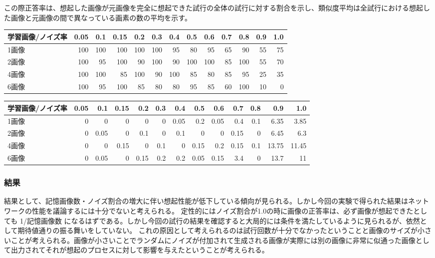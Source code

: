 \documentclass{ltjsarticle}
\begin{document}
この際正答率は、想起した画像が元画像を完全に想起できた試行の全体の試行に対する割合を示し、類似度平均は全試行における想起した画像と元画像の間で異なっている画素の数の平均を示す。
\begin{center}
  \begin{tabular}{|l|r|r|r|r|r|r|r|r|r|r|r|r|} \hline
    学習画像/ノイズ率 & 0.05 & 0.1 & 0.15 & 0.2 & 0.3 & 0.4 & 0.5 & 0.6 & 0.7 & 0.8 & 0.9 & 1.0 \\ \hline
    1画像 & 100 & 100 & 100 & 100 & 100 & 95 & 80 & 95 & 65 & 90 & 55 & 75 \\
    2画像 & 100 & 95 & 100 & 90 & 100 & 90 & 100 & 100 & 85 & 100 & 55 & 70 \\
    4画像 & 100  & 100 & 85 & 100 & 90 & 100 & 85 & 80 & 85 & 95 & 25 & 35 \\
    6画像 & 100 & 95 & 100 & 85 & 80 & 80 & 95 & 85 & 60 & 100 & 10 & 0 \\ \hline
  \end{tabular}
  \begin{tabular}{|l|r|r|r|r|r|r|r|r|r|r|r|r|} \hline
    学習画像/ノイズ率 & 0.05 & 0.1 & 0.15 & 0.2 & 0.3 & 0.4 & 0.5 & 0.6 & 0.7 & 0.8 & 0.9 & 1.0 \\ \hline
    1画像 & 0 & 0 & 0 & 0 & 0 & 0.05 & 0.2 & 0.05 & 0.4 & 0.1 & 6.35 & 3.85 \\
    2画像 & 0 & 0.05 & 0 & 0.1 & 0 & 0.1 & 0 & 0 & 0.15 & 0 & 6.45 & 6.3 \\
    4画像 & 0  & 0 & 0.15 & 0 & 0.1 & 0 & 0.15 & 0.2 & 0.15 & 0.1 & 13.75 & 11.45 \\
    6画像 & 0 & 0.05 & 0 & 0.15 & 0.2 & 0.2 & 0.05 & 0.15 & 3.4 & 0 & 13.7 & 11 \\ \hline
  \end{tabular}
\end{center}

\subsubsection{結果}
結果として、記憶画像数・ノイズ割合の増大に伴い想起性能が低下している傾向が見られる。しかし今回の実験で得られた結果はネットワークの性能を議論するには十分でないと考えられる。
定性的にはノイズ割合が1.0の時に画像の正答率は、必ず画像が想起できたとしても 1/記憶画像数 になるはずである。しかし今回の試行の結果を確認すると大局的には条件を満たしているように見られるが、依然として期待値通りの振る舞いをしていない。
これの原因として考えられるのは試行回数が十分でなかったということと画像のサイズが小さいことが考えられる。画像が小さいことでランダムにノイズが付加されて生成される画像が実際には別の画像に非常に似通った画像として出力されてそれが想起のプロセスに対して影響を与えたということが考えられる。
\newpage
\end{document}
